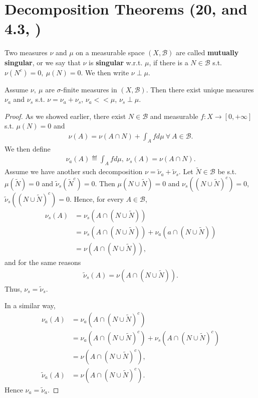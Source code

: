 \section{Decomposition Theorems \tiny{(20, \cite{schilling2017measures} and 4.3, \cite{Gerald_Teschl})}}
\begin{definition}
    Two measures \(\nu\) and \(\mu\) on a measurable space \((X,\mathscr{B})\) are called \textbf{mutually singular}, or we say that \(\nu\) is \textbf{singular} w.r.t. \(\mu\), if there is a \(N\in\mathscr{B}\) s.t. \(\nu(N^c)=0, \ \mu(N)=0\). We then write \(\nu \perp \mu\).
\end{definition}
\begin{theorem}
    Assume \(\nu,\ \mu\) are \(\sigma\)-finite measures in \((X,\mathscr{B})\). Then there exist unique measures \(\nu_a\) and \(\nu_s\) s.t. \(\nu = \nu_a + \nu_s\), \(\nu_a << \mu\), \(\nu_s \perp \mu\).
\end{theorem}
\ifdetailed
\begin{proof}
    As we showed earlier, there exist \(N\in\mathscr{B}\) and measurable \(f:X\rightarrow[0,+\infty]\) s.t. \(\mu(N)=0\) and 
    \begin{align*}
        \nu(A) = \nu(A\cap N) + \int_A fd\mu \ \forall \ A\in\mathscr{B}.
    \end{align*}
    We then define
    \begin{align*}
        \nu_a(A)\eqdef \int_A fd\mu, \ \nu_s(A) = \nu(A\cap N).
    \end{align*} 
    Assume we have another such decomposition \(\nu = \tilde{\nu}_a + \tilde{\nu}_s\). Let \(\tilde{N}\in\mathscr{B}\) be s.t. \(\mu(\tilde{N})=0\) and \(\tilde{\nu}_s(\tilde{N}^c)=0\). Then \(\mu(N\cup\tilde{N})=0\) and \(\nu_s((N\cup\tilde{N})^c)=0\), \(\tilde{\nu}_s((N\cup\tilde{N})^c)=0\). Hence, for every \(A\in\mathscr{B}\), 
    \begin{align*}
        \nu_s(A) &= \nu_s\left(A\cap\left(N\cup\tilde{N}\right)\right) \\ 
        &= \nu_s\left(A\cap\left(N\cup\tilde{N}\right)\right) + \nu_a\left(a\cap\left(N\cup\tilde{N}\right)\right) \\
        &= \nu\left(A\cap\left(N\cup\tilde{N}\right)\right),
    \end{align*}
    and for the same reasons
    \begin{align*}
        \tilde{\nu}_s(A) = \nu\left(A\cap\left(N\cup\tilde{N}\right)\right).
    \end{align*}
    Thus, \(\nu_s=\tilde{\nu}_s\). 

    In a similar way,
    \begin{align*}
        \nu_a(A) &= \nu_a\left(A\cap\left(N\cup\tilde{N}\right)^c\right) \\
        &= \nu_a\left(A\cap\left(N\cup\tilde{N}\right)^c\right) + \nu_s\left(A\cap\left(N\cup\tilde{N}\right)^c\right) \\
        &= \nu\left(A\cap\left(N\cup\tilde{N}\right)^c\right), \\
        \tilde{\nu}_a(A) &= \nu\left(A\cap\left(N\cup\tilde{N}\right)^c\right).
    \end{align*}
    Hence \(\nu_a = \tilde{\nu}_a\).
\end{proof}

